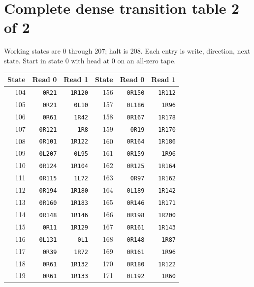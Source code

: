 \section*{Complete dense transition table 2 of 2}
\noindent Working states are 0 through 207; halt is 208. Each entry is write, direction, next state. Start in state 0 with head at 0 on an all-zero tape.\par\medskip
\begin{center}\fontsize{9}{10}\selectfont\setlength{\tabcolsep}{11pt}
\begin{tabular}{rrr@{\hspace{22pt}}rrr}\toprule
State & Read 0 & Read 1 & State & Read 0 & Read 1\\\midrule
104 & \texttt{0R21} & \texttt{1R120} & 156 & \texttt{0R150} & \texttt{1R112} \\
105 & \texttt{0R21} & \texttt{0L10} & 157 & \texttt{0L186} & \texttt{1R96} \\
106 & \texttt{0R61} & \texttt{1R42} & 158 & \texttt{0R167} & \texttt{1R178} \\
107 & \texttt{0R121} & \texttt{1R8} & 159 & \texttt{0R19} & \texttt{1R170} \\
108 & \texttt{0R101} & \texttt{1R122} & 160 & \texttt{0R164} & \texttt{1R186} \\
109 & \texttt{0L207} & \texttt{0L95} & 161 & \texttt{0R159} & \texttt{1R96} \\
110 & \texttt{0R124} & \texttt{1R104} & 162 & \texttt{0R125} & \texttt{1R164} \\
111 & \texttt{0R115} & \texttt{1L72} & 163 & \texttt{0R97} & \texttt{1R162} \\
112 & \texttt{0R194} & \texttt{1R180} & 164 & \texttt{0L189} & \texttt{1R142} \\
113 & \texttt{0R160} & \texttt{1R183} & 165 & \texttt{0R146} & \texttt{1R171} \\
114 & \texttt{0R148} & \texttt{1R146} & 166 & \texttt{0R198} & \texttt{1R200} \\
115 & \texttt{0R11} & \texttt{1R129} & 167 & \texttt{0R161} & \texttt{1R143} \\
116 & \texttt{0L131} & \texttt{0L1} & 168 & \texttt{0R148} & \texttt{1R87} \\
117 & \texttt{0R39} & \texttt{1R72} & 169 & \texttt{0R161} & \texttt{1R96} \\
118 & \texttt{0R61} & \texttt{1R132} & 170 & \texttt{0R180} & \texttt{1R122} \\
119 & \texttt{0R61} & \texttt{1R133} & 171 & \texttt{0L192} & \texttt{1R60} \\

\end{tabular}
\end{center}
